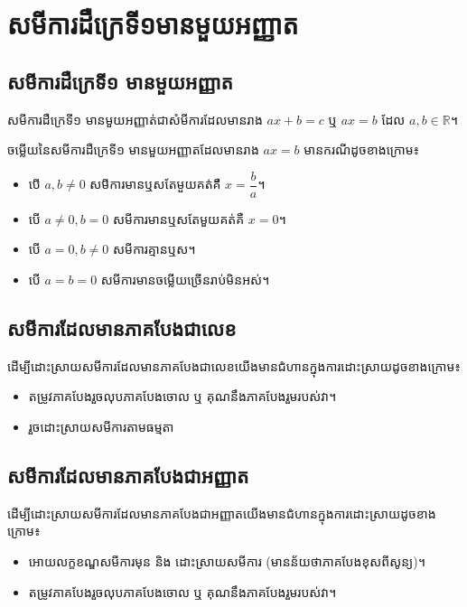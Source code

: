 \chapter{សមីការដឺក្រេទី១មានមួយអញ្ញាត}

\section{សមីការដឺក្រេទី១ មានមួយអញ្ញាត}
\begin{definition}
សមីការដឺក្រេទី១ មានមួយអញ្ញាត់ជាសំមីការដែលមានរាង $ax+b=c$ ឬ $ax=b$ ដែល $a,b\in \mathbb{R}$។
\end{definition}

\begin{generality}
ចម្លើយនៃសមីការដឺក្រេទី១ មានមួយអញ្ញាតដែលមានរាង $ax=b$ មានករណីដូចខាងក្រោម៖
\begin{itemize}
\item បើ $a,b\ne 0$ សមីការមានឬសតែមួយគត់គឺ $x=\dfrac{b}{a}$។
\item បើ $a\ne 0, b=0$ សមីការមានឬសតែមួយគត់គឺ $x=0$។
\item បើ $a=0,b\ne 0$ សមីការគ្មានឬស។
\item បើ $a=b=0$ សមីការមានចម្លើយច្រើនរាប់មិនអស់។
\end{itemize}
\end{generality}
\section{សមីការដែលមានភាគបែងជាលេខ}
\begin{generality}
ដើម្បីដោះស្រាយសមីការដែលមានភាគបែងជាលេខយើងមានជំហានក្នុងការដោះស្រាយដូចខាងក្រោម៖
\begin{itemize}
\item តម្រូវភាគបែងរួចលុបភាគបែងចោល ឬ គុណនឹងភាគបែងរួមរបស់វា។
\item រួចដោះស្រាយសមីការតាមធម្មតា
\end{itemize}
\end{generality}
\section{សមីការដែលមានភាគបែងជាអញ្ញាត}
\begin{generality}
ដើម្បីដោះស្រាយសមីការដែលមានភាគបែងជាអញ្ញាតយើងមានជំហានក្នុងការដោះស្រាយដូចខាងក្រោម៖
\begin{itemize}
\item អោយលក្ខខណ្ឌសមីការមុន និង ដោះស្រាយសមីការ (មានន័យថាភាគបែងខុសពីសូន្យ)។
\item តម្រូវភាគបែងរួចលុបភាគបែងចោល ឬ គុណនឹងភាគបែងរួមរបស់វា។
\end{itemize}
\end{generality}
